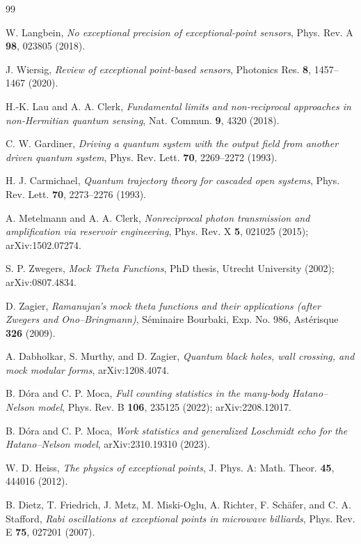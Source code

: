 \documentclass[11pt,a4paper]{article}
\begin{document}
\begin{thebibliography}{99}

W. Langbein,
\emph{No exceptional precision of exceptional-point sensors},
Phys. Rev. A \textbf{98}, 023805 (2018).

J. Wiersig,
\emph{Review of exceptional point-based sensors},
Photonics Res. \textbf{8}, 1457--1467 (2020).

H.-K. Lau and A. A. Clerk,
\emph{Fundamental limits and non-reciprocal approaches in non-Hermitian quantum sensing},
Nat. Commun. \textbf{9}, 4320 (2018).

C. W. Gardiner,
\emph{Driving a quantum system with the output field from another driven quantum system},
Phys. Rev. Lett. \textbf{70}, 2269--2272 (1993).

H. J. Carmichael,
\emph{Quantum trajectory theory for cascaded open systems},
Phys. Rev. Lett. \textbf{70}, 2273--2276 (1993).

A. Metelmann and A. A. Clerk,
\emph{Nonreciprocal photon transmission and amplification via reservoir engineering},
Phys. Rev. X \textbf{5}, 021025 (2015); arXiv:1502.07274.

S. P. Zwegers,
\emph{Mock Theta Functions},
PhD thesis, Utrecht University (2002); arXiv:0807.4834.

D. Zagier,
\emph{Ramanujan's mock theta functions and their applications (after Zwegers and Ono--Bringmann)},
S\'eminaire Bourbaki, Exp. No. 986, Ast\'erisque \textbf{326} (2009).

A. Dabholkar, S. Murthy, and D. Zagier,
\emph{Quantum black holes, wall crossing, and mock modular forms},
arXiv:1208.4074.

B. D\'ora and C. P. Moca,
\emph{Full counting statistics in the many-body Hatano--Nelson model},
Phys. Rev. B \textbf{106}, 235125 (2022); arXiv:2208.12017.

B. D\'ora and C. P. Moca,
\emph{Work statistics and generalized Loschmidt echo for the Hatano--Nelson model},
arXiv:2310.19310 (2023).

W. D. Heiss,
\emph{The physics of exceptional points},
J. Phys. A: Math. Theor. \textbf{45}, 444016 (2012).

B. Dietz, T. Friedrich, J. Metz, M. Miski-Oglu, A. Richter, F. Sch\"afer,
and C. A. Stafford,
\emph{Rabi oscillations at exceptional points in microwave billiards},
Phys. Rev. E \textbf{75}, 027201 (2007).


\end{thebibliography}
\end{document}
